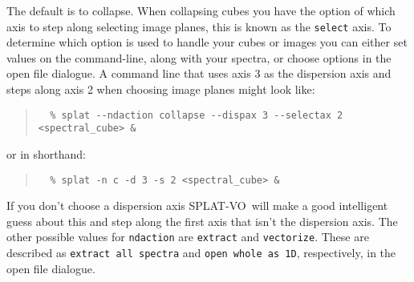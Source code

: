 \documentclass[twoside,11pt]{article}
\newcommand{\htmladdnormallinkfoot}[2]{#1\footnote{#2}}
\renewcommand{\_}{\texttt{\symbol{95}}}
\newcommand{\SPLAT}{\textsf{SPLAT-VO}}
\newcommand{\hitext}[1]{\texttt{#1}}
\newcommand{\ie}{\textit{i.e.}}
\begin{document}
The default is to collapse. When collapsing cubes you have the option of which
axis to step along selecting image planes, this is known as the
\hitext{select} axis. To determine which option is used to handle your cubes or
images you can either set values on the command-line, along with your spectra,
or choose options in the open file dialogue. A command line that uses axis 3 as
the dispersion axis and steps along axis 2 when choosing image planes might
look like:
\begin{quote}
\begin{verbatim}
  % splat --ndaction collapse --dispax 3 --selectax 2 <spectral_cube> &
\end{verbatim}
\end{quote}
or in shorthand:
\begin{quote}
\begin{verbatim}
  % splat -n c -d 3 -s 2 <spectral_cube> &
\end{verbatim}
\end{quote}
If you don't choose a dispersion axis \SPLAT\ will make a good intelligent
guess about this and step along the first axis that isn't the dispersion axis.
The other possible values for \hitext{ndaction} are \hitext{extract} and
\hitext{vectorize}. These are described as \hitext{extract all spectra}
and \hitext{open whole as 1D}, respectively, in the open file dialogue.

%



\end{document}

